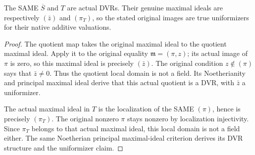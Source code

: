 \begin{lemma}
\label{lem:gauss-surface-original-residual-vertical-dvrs}
\leanok
The SAME $\overline S$ and $T$ are actual DVRs. Their genuine maximal ideals
are respectively $(\bar z)$ and $(\pi_T)$, so the stated original images
are true uniformizers for their native additive valuations.
\end{lemma}
\begin{proof}
The quotient map takes the original maximal ideal to the quotient maximal
ideal. Apply it to the original equality $\mathfrak m=(\pi,z)$; its actual
image of $\pi$ is zero, so this maximal ideal is precisely $(\bar z)$.
The original condition $z\notin(\pi)$ says that $\bar z\ne0$. Thus the
quotient local domain is not a field. Its Noetherianity and principal maximal
ideal derive that this actual quotient is a DVR, with $\bar z$ a uniformizer.

The actual maximal ideal in $T$ is the localization of the SAME $(\pi)$,
hence is precisely $(\pi_T)$. The original nonzero $\pi$ stays nonzero by
localization injectivity. Since $\pi_T$ belongs to that actual maximal ideal,
this local domain is not a field either. The same Noetherian principal
maximal-ideal criterion derives its DVR structure and the uniformizer claim.
\end{proof}

